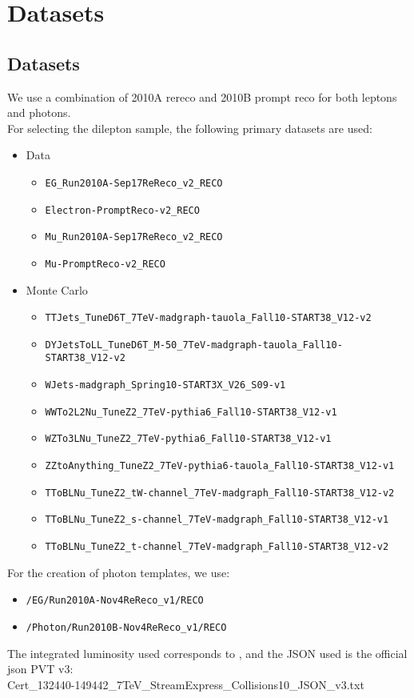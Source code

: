 
\section{Datasets}
\label{sec:datasets}

\subsection{Datasets}

We use a combination of 2010A rereco and 2010B prompt reco for both leptons and photons.
\\
For selecting the dilepton sample, the following primary datasets are used:


\begin{itemize}
\item Data 
\begin{itemize}
\item \verb=EG_Run2010A-Sep17ReReco_v2_RECO=
\item \verb=Electron-PromptReco-v2_RECO=
\item \verb=Mu_Run2010A-Sep17ReReco_v2_RECO=
\item \verb=Mu-PromptReco-v2_RECO=
\end{itemize}

\item Monte Carlo
\begin{itemize} 
\item \verb=TTJets_TuneD6T_7TeV-madgraph-tauola_Fall10-START38_V12-v2=
\item \verb=DYJetsToLL_TuneD6T_M-50_7TeV-madgraph-tauola_Fall10-START38_V12-v2=
\item \verb=WJets-madgraph_Spring10-START3X_V26_S09-v1=
\item \verb=WWTo2L2Nu_TuneZ2_7TeV-pythia6_Fall10-START38_V12-v1=
\item \verb=WZTo3LNu_TuneZ2_7TeV-pythia6_Fall10-START38_V12-v1=
\item \verb=ZZtoAnything_TuneZ2_7TeV-pythia6-tauola_Fall10-START38_V12-v1=
\item \verb=TToBLNu_TuneZ2_tW-channel_7TeV-madgraph_Fall10-START38_V12-v2=
\item \verb=TToBLNu_TuneZ2_s-channel_7TeV-madgraph_Fall10-START38_V12-v1=
\item \verb=TToBLNu_TuneZ2_t-channel_7TeV-madgraph_Fall10-START38_V12-v2=
\end{itemize}
\end{itemize}

For the creation of photon templates, we use:

\begin{itemize}
\item \verb=/EG/Run2010A-Nov4ReReco_v1/RECO=
\item \verb=/Photon/Run2010B-Nov4ReReco_v1/RECO=
\end{itemize}

The integrated luminosity used corresponds to \lumi, and the JSON used is the official json PVT v3: \\
Cert\_132440-149442\_7TeV\_StreamExpress\_Collisions10\_JSON\_v3.txt